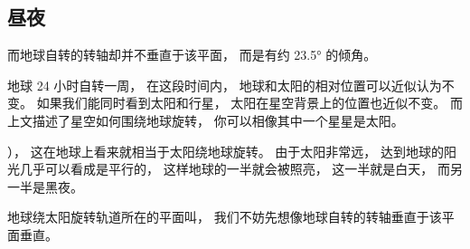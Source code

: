 \subsection{昼夜}




而地球自转的转轴却并不垂直于该平面， 而是有约 23.5° 的倾角。



地球 24 小时自转一周， 在这段时间内， 地球和太阳的相对位置可以近似认为不变。 如果我们能同时看到太阳和行星， 太阳在星空背景上的位置也近似不变。 而上文描述了星空如何围绕地球旋转， 你可以相像其中一个星星是太阳。



）， 这在地球上看来就相当于太阳绕地球旋转。 由于太阳非常远， 达到地球的阳光几乎可以看成是平行的， 这样地球的一半就会被照亮， 这一半就是白天， 而另一半是黑夜。

地球绕太阳旋转轨道所在的平面叫， 我们不妨先想像地球自转的转轴垂直于该平面垂直。 












